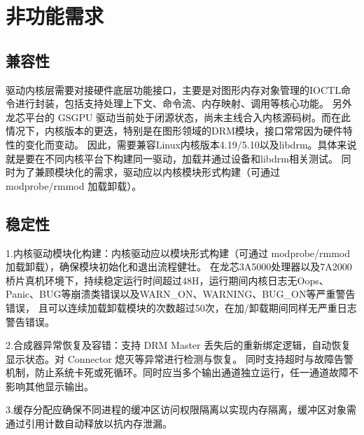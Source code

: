 \section{非功能需求}

\subsection{兼容性}
\label{p:兼容性}

驱动内核层需要对接硬件底层功能接口，主要是对图形内存对象管理的IOCTL命令进行封装，包括支持处理上下文、命令流、内存映射、调用等核心功能。
另外龙芯平台的 GSGPU 驱动当前处于闭源状态，尚未主线合入内核源码树。而在此情况下，内核版本的更迭，特别是在图形领域的DRM模块，接口常常因为硬件特性的变化而变动。
因此，需要兼容Linux内核版本4.19/5.10以及libdrm。具体来说就是要在不同内核平台下构建同一驱动，加载并通过设备和libdrm相关测试。
同时为了兼顾模块化的需求，驱动应以内核模块形式构建（可通过 modprobe/rmmod 加载卸载）。



\subsection{稳定性​}

1.内核驱动模块化构建：内核驱动应以模块形式构建（可通过 modprobe/rmmod 加载卸载），确保模块初始化和退出流程健壮。
在龙芯3A5000处理器以及7A2000桥片真机环境下，持续稳定运行时间超过48H，运行期间内核日志无Oops、Panic、BUG等崩溃类错误以及WARN\_ON、WARNING、BUG\_ON等严重警告错误，
且可以连续加载卸载模块的次数超过50次，在加/卸载期间同样无严重日志警告错误。

2.合成器异常恢复及容错：支持 DRM Master 丢失后的重新绑定逻辑，自动恢复显示状态。对 Connector 熄灭等异常进行检测与恢复。
同时支持超时与故障告警机制，防止系统卡死或死循环。同时应当多个输出通道独立运行，任一通道故障不影响其他显示输出。

3.缓存分配应确保不同进程的缓冲区访问权限隔离以实现内存隔离，缓冲区对象需通过引用计数自动释放以抗内存泄漏。

